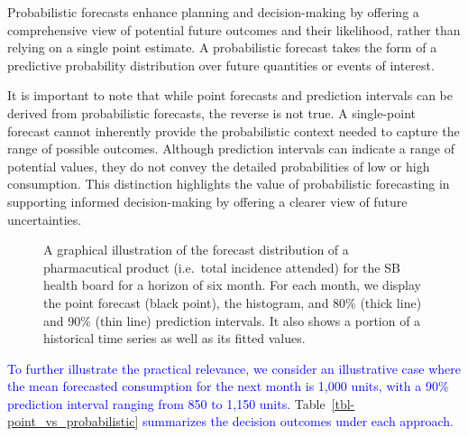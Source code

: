 \documentclass[
  authoryear,
  preprint,
  3p]{elsarticle}
\begin{document}
Probabilistic forecasts enhance planning and decision-making by offering
a comprehensive view of potential future outcomes and their likelihood,
rather than relying on a single point estimate. A probabilistic forecast
takes the form of a predictive probability distribution over future
quantities or events of interest.

It is important to note that while point forecasts and prediction
intervals can be derived from probabilistic forecasts, the reverse is
not true. A single-point forecast cannot inherently provide the
probabilistic context needed to capture the range of possible outcomes.
Although prediction intervals can indicate a range of potential values,
they do not convey the detailed probabilities of low or high
consumption. This distinction highlights the value of probabilistic
forecasting in supporting informed decision-making by offering a clearer
view of future uncertainties.

\begin{figure}[H]


\caption{\label{fig-forecast-density-hstep}A graphical illustration of
the forecast distribution of a pharmacutical product (i.e.~total
incidence attended) for the SB health board for a horizon of six month.
For each month, we display the point forecast (black point), the
histogram, and 80\% (thick line) and 90\% (thin line) prediction
intervals. It also shows a portion of a historical time series as well
as its fitted values.}

\end{figure}%

\textcolor{blue}{To further illustrate the practical relevance, we consider an illustrative case where the mean forecasted consumption for the next month is 1,000 units, with a 90\% prediction interval ranging from 850 to 1,150 units.}
Table~\ref{tbl-point_vs_probabilistic}
\textcolor{blue}{summarizes the decision outcomes under each approach.}
\end{document}

